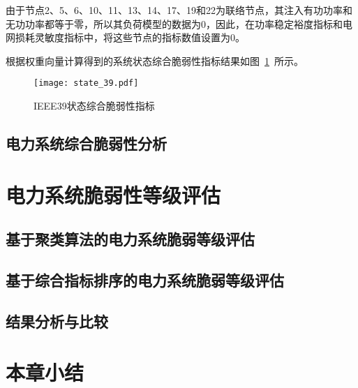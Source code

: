 由于节点2、5、6、10、11、13、14、17、19和22为联络节点，其注入有功功率和无功功率都等于零，所以其负荷模型的数据为0，因此，在功率稳定裕度指标和电网损耗灵敏度指标中，将这些节点的指标数值设置为0。

根据权重向量计算得到的系统状态综合脆弱性指标结果如图~\ref{fig:state_39}~所示。
\begin{figure}[H] %
  \centering
  \texttt{[image: state\_39.pdf]}
  \caption{IEEE39状态综合脆弱性指标}
  \label{fig:state_39}
\end{figure}



\subsection{电力系统综合脆弱性分析}
\label{sec:singleAnalysis}





\section{电力系统脆弱性等级评估}
\label{sec:multiAssessment}




\subsection{基于聚类算法的电力系统脆弱等级评估}
\label{sec:multiVSsingle}




\subsection{基于综合指标排序的电力系统脆弱等级评估}
\label{sec:multiAnalysis}





\subsection{结果分析与比较}




\section{本章小结}
\label{sec:sum5}


